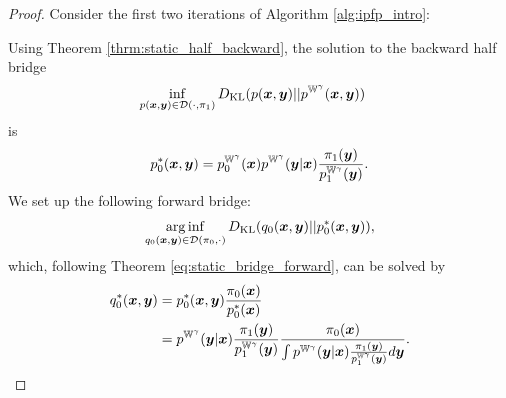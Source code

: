 \documentclass[a4paper,12pt,twoside,openright]{report}
\theoremstyle{definition}
\begin{document}
\begin{proof}
Consider the first two iterations of Algorithm \ref{alg:ipfp_intro}:

Using Theorem \ref{thrm:static_half_backward}, the solution to the backward half bridge
 \begin{align}
        \inf_{p({\bm{x}},{\bm{y}}) \in {\mathcal{D}}( \cdot, \pi_1)} D_{\mathrm{KL}}  &(p({\bm{x}},{\bm{y}}) || p^{\mathbb{W}^{\gamma}}({\bm{x}},{\bm{y}})) \nonumber 
\end{align}
is
\begin{align}
    p_0^{*} ({\bm{x}}, {\bm{y}}) = p^{\mathbb{W}^{\gamma}}_0({\bm{x}}) p^{\mathbb{W}^{\gamma}}({\bm{y}}| {\bm{x}}) \frac{\pi_1({\bm{y}})}{p^{\mathbb{W}^{\gamma}}_1({\bm{y}})}.
\end{align}
We set up the following forward bridge:
\begin{align}
    \operatorname*{arg\,inf}_{q_0({\bm{x}}, {\bm{y}})  \in {\mathcal{D}}(\pi_0 , \cdot)}D_{\mathrm{KL}} (q_0({\bm{x}}, {\bm{y}}) ||p_0^{*} ({\bm{x}}, {\bm{y}})),
\end{align}
which, following Theorem \ref{eq:static_bridge_forward}, can be solved by
\begingroup
\allowdisplaybreaks
\begin{align}
    q_0^{*} ({\bm{x}}, {\bm{y}}) &= p_0^{*} ({\bm{x}}, {\bm{y}}) \frac{\pi_0({\bm{x}})}{p_0^{*} ({\bm{x}})} \\
 &=  p^{\mathbb{W}^{\gamma}}({\bm{y}}| {\bm{x}}) \frac{\pi_1({\bm{y}})}{p^{\mathbb{W}^{\gamma}}_1({\bm{y}})} \frac{\pi_0({\bm{x}})}{\int   p^{\mathbb{W}^{\gamma}}({\bm{y}}| {\bm{x}}) \frac{\pi_1({\bm{y}})}{p^{\mathbb{W}^{\gamma}}_1({\bm{y}})} d{\bm{y}}}.
\end{align}
\endgroup


\end{proof}
\end{document}
